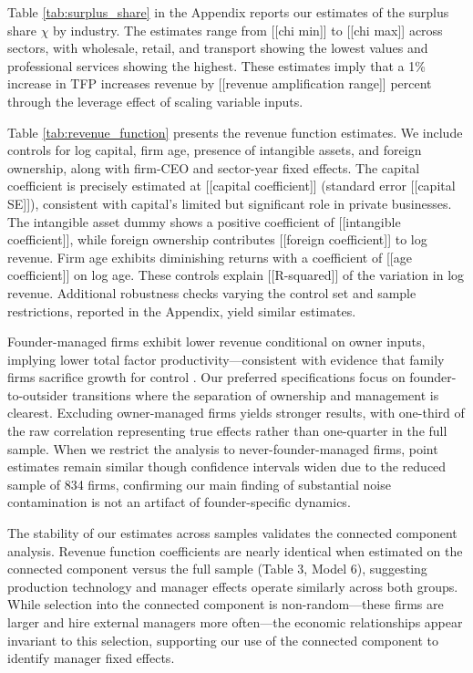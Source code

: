 \documentclass[11pt,a4paper]{article}
\begin{document}
Table \ref{tab:surplus_share} in the Appendix reports our estimates of the surplus share $\chi$ by industry. The estimates range from [[chi min]] to [[chi max]] across sectors, with wholesale, retail, and transport showing the lowest values and professional services showing the highest. These estimates imply that a 1\% increase in TFP increases revenue by [[revenue amplification range]] percent through the leverage effect of scaling variable inputs.

Table \ref{tab:revenue_function} presents the revenue function estimates. We include controls for log capital, firm age, presence of intangible assets, and foreign ownership, along with firm-CEO and sector-year fixed effects. The capital coefficient is precisely estimated at [[capital coefficient]] (standard error [[capital SE]]), consistent with capital's limited but significant role in private businesses. The intangible asset dummy shows a positive coefficient of [[intangible coefficient]], while foreign ownership contributes [[foreign coefficient]] to log revenue. Firm age exhibits diminishing returns with a coefficient of [[age coefficient]] on log age. These controls explain [[R-squared]] of the variation in log revenue. Additional robustness checks varying the control set and sample restrictions, reported in the Appendix, yield similar estimates.

Founder-managed firms exhibit lower revenue conditional on owner inputs, implying lower total factor productivity—consistent with evidence that family firms sacrifice growth for control \citep{bennedsen2007inside}. Our preferred specifications focus on founder-to-outsider transitions where the separation of ownership and management is clearest. Excluding owner-managed firms yields stronger results, with one-third of the raw correlation representing true effects rather than one-quarter in the full sample. When we restrict the analysis to never-founder-managed firms, point estimates remain similar though confidence intervals widen due to the reduced sample of 834 firms, confirming our main finding of substantial noise contamination is not an artifact of founder-specific dynamics.




The stability of our estimates across samples validates the connected component analysis. Revenue function coefficients are nearly identical when estimated on the connected component versus the full sample (Table 3, Model 6), suggesting production technology and manager effects operate similarly across both groups. While selection into the connected component is non-random—these firms are larger and hire external managers more often—the economic relationships appear invariant to this selection, supporting our use of the connected component to identify manager fixed effects.
\end{document}
